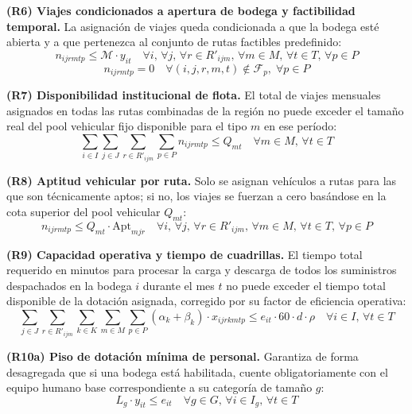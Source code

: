 \documentclass[letterpaper]{article}
\begin{document}
\begin{flushleft}
\textbf{(R6) Viajes condicionados a apertura de bodega y factibilidad temporal.} La asignaci\'on de viajes queda condicionada a que la bodega est\'e abierta y a que pertenezca al conjunto de rutas factibles predefinido:
\begin{equation}
n_{ijrmtp} \leq \mathcal{M} \cdot y_{it}
\quad \forall i,\, \forall j,\, \forall r \in R'_{ijm},\, \forall m \in M,\, \forall t \in T,\, \forall p \in P
\end{equation}
\begin{equation*}
n_{ijrmtp} = 0 \quad \forall (i,j,r,m,t) \notin \mathcal{F}_p,\; \forall p \in P
\end{equation*}

\textbf{(R7) Disponibilidad institucional de flota.} El total de viajes mensuales asignados en todas las rutas combinadas de la regi\'on no puede exceder el tama\~no real del pool vehicular fijo disponible para el tipo $m$ en ese per\'iodo:
\begin{equation}
\sum_{i \in I} \sum_{j \in J} \sum_{r \in R'_{ijm}} \sum_{p \in P} n_{ijrmtp} \leq Q_{mt}
\quad \forall m \in M,\, \forall t \in T
\end{equation}

\textbf{(R8) Aptitud vehicular por ruta.} Solo se asignan veh\'iculos a rutas para las que son t\'ecnicamente aptos; si no, los viajes se fuerzan a cero bas\'andose en la cota superior del pool vehicular $Q_{mt}$:
\begin{equation}
n_{ijrmtp} \leq Q_{mt} \cdot \mathrm{Apt}_{mjr}
\quad \forall i,\, \forall j,\, \forall r \in R'_{ijm},\, \forall m \in M,\, \forall t \in T,\, \forall p \in P
\end{equation}

\textbf{(R9) Capacidad operativa y tiempo de cuadrillas.} El tiempo total requerido en minutos para procesar la carga y descarga de todos los suministros despachados en la bodega $i$ durante el mes $t$ no puede exceder el tiempo total disponible de la dotaci\'on asignada, corregido por su factor de eficiencia operativa:
\begin{equation}
\sum_{j \in J} \sum_{r \in R'_{ijm}} \sum_{k \in K} \sum_{m \in M} \sum_{p \in P} (\alpha_k + \beta_k) \cdot x_{ijrkmtp}
\leq e_{it} \cdot 60 \cdot d \cdot \rho
\quad \forall i \in I,\, \forall t \in T
\end{equation}

\textbf{(R10a) Piso de dotaci\'on m\'inima de personal.} Garantiza de forma desagregada que si una bodega est\'a habilitada, cuente obligatoriamente con el equipo humano base correspondiente a su categor\'ia de tama\~no $g$:
\begin{equation}
L_g \cdot y_{it} \leq e_{it} \quad \forall g \in G,\, \forall i \in I_g,\, \forall t \in T
\end{equation}


\end{flushleft}
\end{document}
